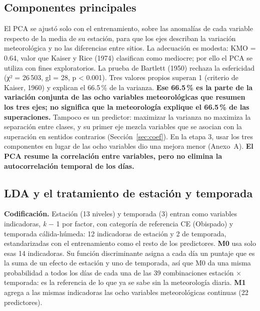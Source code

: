 \subsection{Componentes principales}\label{sec:pca-metodo}
El PCA se ajustó solo con el entrenamiento, sobre las anomalías de cada variable respecto de la media de su estación, para que los ejes describan la variación meteorológica y no las diferencias entre sitios. La adecuación es modesta: KMO = 0.64, valor que Kaiser y Rice (1974) clasifican como mediocre; por ello el PCA se utiliza con fines exploratorios. La prueba de Bartlett (1950) rechaza la esfericidad (χ² = 26\,503, gl = 28, p < 0.001). Tres valores propios superan 1 (criterio de Kaiser, 1960) y explican el 66.5\,\% de la varianza. \textbf{Ese 66.5\,\% es la parte de la variación conjunta de las ocho variables meteorológicas que resumen los tres ejes; no significa que la meteorología explique el 66.5\,\% de las superaciones.} Tampoco es un predictor: maximizar la varianza no maximiza la separación entre clases, y su primer eje mezcla variables que se asocian con la superación en sentidos contrarios (Sección~\ref{sec:coef}). En la etapa 3, usar los tres componentes en lugar de las ocho variables dio una mejora menor (Anexo~A). \textbf{El PCA resume la correlación entre variables, pero no elimina la autocorrelación temporal de los días.}

\subsection{LDA y el tratamiento de estación y temporada}\label{sec:lda}
\textbf{Codificación.} Estación (13 niveles) y temporada (3) entran como variables indicadoras, \emph{k} − 1 por factor, con categoría de referencia CE (Obispado) y temporada cálida-húmeda: 12 indicadoras de estación y 2 de temporada, estandarizadas con el entrenamiento como el resto de los predictores. \textbf{M0} usa solo esas 14 indicadoras. Su función discriminante asigna a cada día un puntaje que es la suma de un efecto de estación y uno de temporada, así que M0 da una misma probabilidad a todos los días de cada una de las 39 combinaciones estación × temporada: es la referencia de lo que ya se sabe sin la meteorología diaria. \textbf{M1} agrega a las mismas indicadoras las ocho variables meteorológicas continuas (22 predictores).

